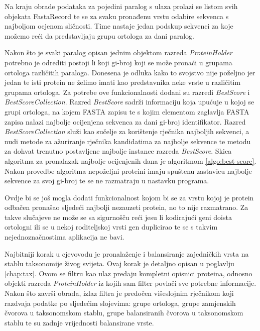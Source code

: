 Na kraju obrade podataka za pojedini paralog s ulaza prolazi se listom svih
objekata FastaRecord te se za svaku pronađenu vrstu odabire sekvenca s najboljom
ocjenom sličnosti. Time nastaje jedan podskup sekvenci za koje možemo reći da
predstavljaju grupu ortologa za dani paralog.

Nakon što je svaki paralog opisan jednim objektom razreda \emph{ProteinHolder}
potrebno je odrediti postoji li koji gi-broj koji se može pronaći u grupama
ortologa različitih paraloga. Donesena je odluka kako to svojstvo nije poželjno
jer jedan te isti protein ne želimo imati kao predstavnika neke vrste u
različitim grupama ortologa. Za potrebe ove funkcionalnosti dodani su razredi
\emph{BestScore} i \emph{BestScoreCollection}. Razred \emph{BestScore} sadrži
informaciju koja upućuje u kojoj se grupi ortologa, na kojem FASTA zapisu te s
kojim elementom zaglavlja FASTA zapisa nalazi najbolje ocijenjena sekvenca za
dani gi-broj identifikator. Razred \emph{BestScoreCollection} služi kao sučelje
za korištenje rječnika najboljih sekvenci, a nudi metode za ažuriranje rječnika
kandidatima za najbolje sekvence te metodu za dohvat trenutno postavljene
najbolje instance razreda \emph{BestScore}. Skica algoritma za pronalazak
najbolje ocijenjenih dana je algoritmom \ref{algo:best-score}. Nakon provedbe
algoritma nepoželjni proteini imaju spuštenu zastavicu najbolje sekvence za svoj
gi-broj te se ne razmatraju u nastavku programa.



Ovdje bi se još mogla dodati funkcionalnost kojom bi se za vrstu kojoj je
protein odbačen pronašao sljedeći najbolji nezauzeti protein, no to nije
razmatrano. Za takve slučajeve ne može se sa sigurnošču reći jesu li kodirajući
geni doista ortologni ili se u nekoj roditeljskoj vrsti gen duplicirao te se s
takvim nejednoznačnostima aplikacija ne bavi.

Najbitniji korak u cjevovodu je pronalaženje i balansiranje zajedničkih vrsta na
stablu taksonomije živog svijeta. Ovaj korak je detaljno opisan u poglavlju
\ref{chap:tax}. Ovom se filtru kao ulaz predaju kompletni opisnici proteina,
odnosno objekti razreda \emph{ProteinHolder} iz kojih sam filter povlači sve
potrebne informacije. Nakon što završi obrada, izlaz filtra je predočen
višeslojnim rječnikom koji razdvaja podatke po sljedećim slojevima: grupe
ortologa, grupe zamjenskih čvorova u taksonomskom stablu, grupe balansiranih
čvorova u taksonomskom stablu te su zadnje vrijednosti balansirane vrste.

